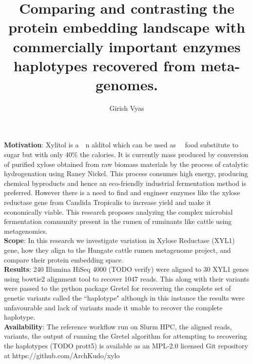 \documentclass{main}
\title{Comparing and contrasting the protein embedding landscape with commercially important enzymes haplotypes recovered from meta-genomes.}    %
\author{Girish Vyas}                      %
\begin{document}
\setlength{\parindent}{0pt}

\onehalfspacing

\begin{singlespace}

  \beforepreface







\countem

  \textbf{Motivation}: Xylitol is a~~n alditol which can be used as~~ food substitute to sugar but with only 40\% the calories. It is currently mass produced by conversion of purified xylose obtained from raw biomass materials by the process of catalytic hydrogenation using Raney Nickel. This process consumes high energy, producing chemical byproducts and hence an eco-friendly industrial fermentation method is preferred. However there is a need to find and engineer enzymes like the xylose reductase gene from Candida Tropicalis to increase yield and make it economically viable. This research proposes analyzing the complex microbial fermentation community present in the rumen of ruminants like cattle using metagenomics.\\
  \textbf{Scope}: In this research we investigate variation in Xylose Reductase (XYL1) gene, how they align to the Hungate cattle rumen metagenome project, and compare their protein embedding space.\\
  \textbf{Results}: 240 Illumina HiSeq 4000 (TODO verify) were aligned to 30 XYL1 genes using bowtie2 alignment tool to recover 1047 reads. This along with their variants were passed to the python package Gretel for recovering the complete set of genetic variants called the ``haplotype" although in this instance the results were unfavourable and lack of variants made it unable to recover the complete haplotype.\\
  \textbf{Availability}: The reference workflow run on Slurm HPC, the aligned reads, variants, the output of running the Gretel algorithm for attempting to recovering the haplotypes (TODO prott5) is available as an MPL-2.0 licensed Git repository at https://github.com/ArchKudo/xylo


\end{singlespace}
\end{document}
